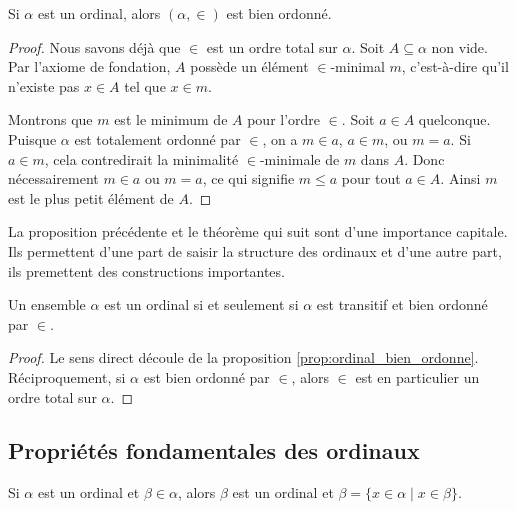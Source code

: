 \begin{proposition}\label{prop:ordinal_bien_ordonne}
	Si $\alpha$ est un ordinal, alors $(\alpha, \in)$ est bien ordonné.
\end{proposition}

\begin{proof}
	Nous savons déjà que $\in$ est un ordre total sur $\alpha$. Soit $A \subseteq \alpha$ non vide. Par l'axiome de fondation, $A$ possède un élément $\in$-minimal $m$, c'est-à-dire qu'il n'existe pas $x \in A$ tel que $x \in m$.

	Montrons que $m$ est le minimum de $A$ pour l'ordre $\in$. Soit $a \in A$ quelconque. Puisque $\alpha$ est totalement ordonné par $\in$, on a $m \in a$, $a \in m$, ou $m = a$. Si $a \in m$, cela contredirait la minimalité $\in$-minimale de $m$ dans $A$. Donc nécessairement $m \in a$ ou $m = a$, ce qui signifie $m \leqslant a$ pour tout $a \in A$. Ainsi $m$ est le plus petit élément de $A$.
\end{proof}

La proposition précédente et le théorème qui suit sont d'une importance capitale. Ils permettent d'une part de saisir la structure des ordinaux et d'une autre part, ils premettent des constructions importantes.

\begin{theoreme}\label{thm:ordinal_caracterisation}
	Un ensemble $\alpha$ est un ordinal si et seulement si $\alpha$ est transitif et bien ordonné par $\in$.
\end{theoreme}

\begin{proof}
	Le sens direct découle de la proposition \ref{prop:ordinal_bien_ordonne}. Réciproquement, si $\alpha$ est bien ordonné par $\in$, alors $\in$ est en particulier un ordre total sur $\alpha$.
\end{proof}

\subsection{Propriétés fondamentales des ordinaux}

\begin{lemme}\label{lem:ordinal_element}
	Si $\alpha$ est un ordinal et $\beta \in \alpha$, alors $\beta$ est un ordinal et $\beta = \{x \in \alpha \mid x \in \beta\}$.
\end{lemme}

